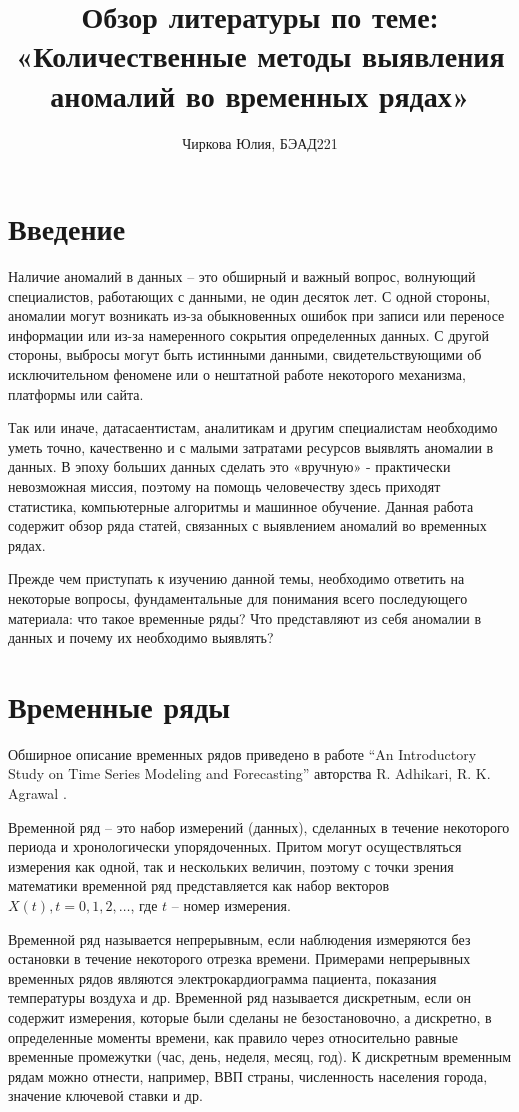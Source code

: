 \documentclass[14pt, letterpaper]{extarticle}
\title{Обзор литературы по теме: \\ «Количественные методы выявления \\ аномалий во временных рядах»}
\author{Чиркова Юлия, БЭАД221}
\begin{document}
\maketitle

\newpage 
\section{Введение}

Наличие аномалий в данных – это обширный и важный вопрос, волнующий специалистов, работающих с данными, не один десяток лет. С одной стороны, аномалии могут возникать из-за обыкновенных ошибок при записи или переносе информации или из-за намеренного сокрытия определенных данных. С другой стороны, выбросы могут быть истинными данными, свидетельствующими об исключительном феномене или о нештатной работе некоторого механизма, платформы или сайта. 

Так или иначе, датасаентистам, аналитикам и другим специалистам необходимо уметь точно, качественно и с малыми затратами ресурсов выявлять аномалии в данных. В эпоху больших данных сделать это «вручную» - практически невозможная миссия, поэтому на помощь человечеству здесь приходят статистика, компьютерные алгоритмы и машинное обучение. Данная работа содержит обзор ряда статей, связанных с выявлением аномалий во временных рядах.

Прежде чем приступать к изучению данной темы, необходимо ответить на некоторые вопросы, фундаментальные для понимания всего последующего материала: что такое временные ряды? Что представляют из себя аномалии в данных и почему их необходимо выявлять? 

\newpage 
\section{Временные ряды}

Обширное описание временных рядов приведено в работе “An Introductory Study on Time Series Modeling and Forecasting” авторства R. Adhikari, R. K. Agrawal \cite{adhikari2013introductory}.  

Временной ряд – это набор измерений (данных), сделанных в течение некоторого периода и хронологически упорядоченных. Притом могут осуществляться измерения как одной, так и нескольких величин, поэтому с точки зрения математики временной ряд представляется как набор векторов $X(t), t=0, 1, 2, …$, где $t$ – номер измерения.

Временной ряд называется непрерывным, если наблюдения измеряются без остановки в течение некоторого отрезка времени. Примерами непрерывных временных рядов являются электрокардиограмма пациента, показания температуры воздуха и др.
Временной ряд называется дискретным, если он содержит измерения, которые были сделаны не безостановочно, а дискретно, в определенные моменты времени, как правило через относительно равные временные промежутки (час, день, неделя, месяц, год). К дискретным временным рядам можно отнести, например, ВВП страны, численность населения города, значение ключевой ставки и др.
\end{document}
